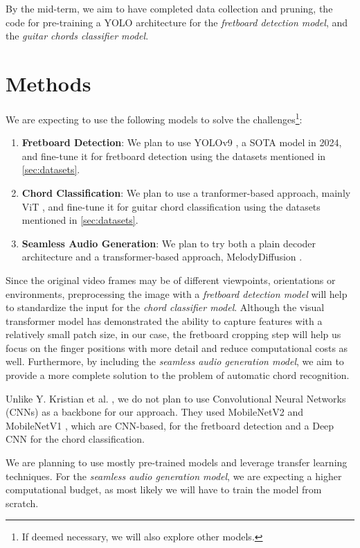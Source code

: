\documentclass[10pt,twocolumn,letterpaper]{article}
\begin{document}
By the mid-term, we aim to have completed data collection and pruning, the code for pre-training a YOLO architecture for the \emph{fretboard detection model}, and the \emph{guitar chords classifier model}.

\section{Methods}\label{sec:methods}

We are expecting to use the following models to solve the challenges\footnote{If deemed necessary, we will also explore other models.}:
\begin{enumerate}[label=\arabic*), itemsep=0.25pt]
    \item \textbf{Fretboard Detection}: We plan to use YOLOv9 \cite{wang2024yolov9}, a SOTA model in 2024, and fine-tune it for fretboard detection using the datasets mentioned in \cref{sec:datasets}.
    \item \textbf{Chord Classification}: We plan to use a tranformer-based approach, mainly ViT \cite{dosovitskiy2020image}, and fine-tune it for guitar chord classification using the datasets mentioned in \cref{sec:datasets}.
    \item \textbf{Seamless Audio Generation}: We plan to try both a plain decoder architecture and a transformer-based approach, MelodyDiffusion \cite{math11081915}.
\end{enumerate}

Since the original video frames may be of different viewpoints, orientations or environments, preprocessing the image with a \emph{fretboard detection model} will help to standardize the input for the \emph{chord classifier model}. Although the visual transformer model has demonstrated the ability to capture features with a relatively small patch size, in our case, the fretboard cropping step will help us focus on the finger positions with more detail and reduce computational costs as well.
Furthermore, by including the \emph{seamless audio generation model}, we aim to provide a more complete solution to the problem of automatic chord recognition.

Unlike Y. Kristian et al. \cite{Kristian_Zaman_Tenoyo_Jodhinata_2024}, we do not plan to use Convolutional Neural Networks (CNNs) as a backbone for our approach. They used MobileNetV2 and MobileNetV1 \cite{howard2017mobilenets}, which are CNN-based, for the fretboard detection and a Deep CNN for the chord classification. 

We are planning to use mostly pre-trained models and leverage transfer learning techniques. For the \emph{seamless audio generation model}, we are expecting a higher computational budget, as most likely we will have to train the model from scratch.
\end{document}
